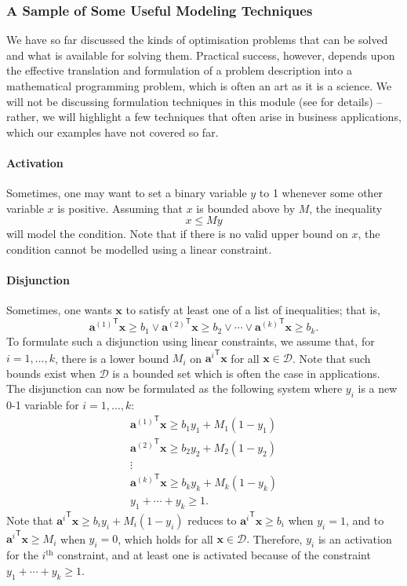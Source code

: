 \subsubsection{A Sample of Some Useful Modeling
Techniques}
We have so far discussed the kinds of optimisation problems that can be
solved and what is available for solving them. Practical success, however, depends upon the effective translation and formulation of a problem description into a mathematical
programming problem, which is often an art as it is a science. We will not be discussing formulation techniques in this module (see \cite{OPT_W} for details) -- rather, we will  highlight  a few techniques
that often arise in business applications, which our examples have not covered so far. 
\paragraph{Activation}
Sometimes, one may want to set a binary variable \(y\) to 1 whenever some
other variable \(x\) is positive. Assuming that \(x\) is bounded above
by \(M\), the inequality \[x \leq My\] will model the condition. Note that if there is no valid upper bound on \(x\), the condition cannot be modelled using a linear constraint.

\paragraph{Disjunction}

Sometimes, one wants \(\mathbf{x}\) to satisfy at least one of a list of
inequalities; that is,
\[{\mathbf{a}^{(1)}}^\mathsf{T}\mathbf{x} \geq b_1 
 \lor {\mathbf{a}^{(2)}}^\mathsf{T}\mathbf{x} \geq b_2 
      \lor \cdots 
 \lor {\mathbf{a}^{(k)}}^\mathsf{T}\mathbf{x} \geq b_k.\] To formulate
such a disjunction using linear constraints, we assume that, for \(i = 1,\ldots,k\), there is a lower bound \(M_i\) on
\({\mathbf{a}^i}^\mathsf{T}\mathbf{x}\) for all
\(\mathbf{x}\in \mathcal{D}\). Note that such bounds exist when
\(\mathcal{D}\) is a bounded set which is often the case in
applications. The disjunction can now be formulated as the following
system where \(y_i\) is a new 0-1 variable for \(i = 1,\ldots,k\):
\[\begin{array}{l}
 {\mathbf{a}^{(1)}}^\mathsf{T}\mathbf{x} \geq b_1 y_1 + M_1(1-y_1) \\
 {\mathbf{a}^{(2)}}^\mathsf{T}\mathbf{x} \geq b_2 y_2 + M_2(1-y_2) \\
  \vdots \\
 {\mathbf{a}^{(k)}}^\mathsf{T}\mathbf{x} \geq b_k y_k + M_k(1-y_k) \\
  y_1 + \cdots + y_k \geq 1.
\end{array}\] Note that
\({\mathbf{a}^i}^\mathsf{T}\mathbf{x} \geq b_i y_i + M_i(1-y_i)\)
reduces to \({\mathbf{a}^i}^\mathsf{T}\mathbf{x} \geq b_i\) when
\(y_i = 1\), and to \({\mathbf{a}^i}^\mathsf{T}\mathbf{x} \geq M_i\)
when \(y_i = 0\), which holds for all \(\mathbf{x} \in \mathcal{D}.\)
Therefore, \(y_i\) is an activation for the \(i^{\textrm{th}}\) constraint, and at least one is
activated because of the constraint \(y_1 + \cdots + y_k \geq 1\).

